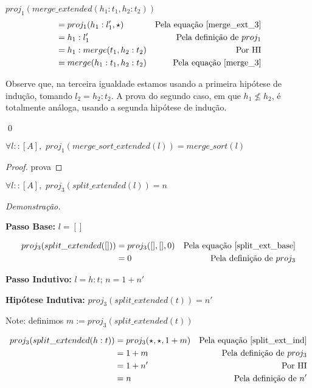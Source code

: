 \documentclass[12pt, oneside, a4paper,english,brazil]{abntex2}
\begin{document}
$ proj_{1}(merge\_extended(h_{1} : t_{1}, h_{2} : t_{2})) $
\begin{align*}
 &= proj_{1}(h_{1} : l'_{1}, \star) &\text{Pela equa\c{c}\~ao \ref{merge_ext_3}} \\
                                                          &= h_{1} : l'_{1} &\text{Pela defini\c{c}\~ao de $proj_{1}$} \\
  &= h_{1} : merge(t_{1}, h_{2} : t_{2}) &\text{Por HI} \\
  &= merge(h_{1} : t_{1}, h_{2} : t_{2}) &\text{Pela equa\c{c}\~ao \ref{merge_3}}
\end{align*}

Observe que, na terceira igualdade estamos usando a primeira hip\'otese de indu\c{c}\~ao, tomando $l_{2} = h_{2} : t_{2}$. A prova do segundo caso, em que $h_{1} \not\le h_{2}$, \'e totalmente an\'aloga, usando a segunda hip\'otese de indu\c{c}\~ao.

\qed

\begin{teorema}
  $\forall l :: [A], \,\, proj_{1}(merge\_sort\_extended(l)) = merge\_sort(l)$
\end{teorema}

\begin{proof}
  prova
\end{proof}

\begin{teorema}
  $\forall l :: [A], \,\, proj_{3}(split\_extended(l)) = n$
\end{teorema}

\noindent \textit{Demonstra\c{c}\~ao.}

\textbf{Passo Base: } $l = []$

\begin{align*}
  proj_{3}(split\_extended([])) &= proj_{3}([], [], 0) &\text{Pela equa\c{c}\~ao \ref{split_ext_base}} \\
  &= 0 &\text{Pela defini\c{c}\~ao de $proj_{3}$}
\end{align*}

\textbf{Passo Indutivo: } $l = h : t$; $n = 1 + n'$

\textbf{Hip\'otese Indutiva: } $proj_{3}(split\_extended(t)) = n'$

Note: definimos $m := proj_{3}(split\_extended(t))$

\begin{align*}
  proj_{3}(split\_extended(h : t)) &= proj_{3}(\star, \star, 1 + m) &\text{Pela equa\c{c}\~ao \ref{split_ext_ind}}\\
                                   &= 1 + m &\text{Pela defini\c{c}\~ao de $proj_{3}$}\\
                                   &= 1 + n' &\text{Por HI} \\
  &= n &\text{Pela defini\c{c}\~ao de $n'$}
\end{align*}
\end{document}
